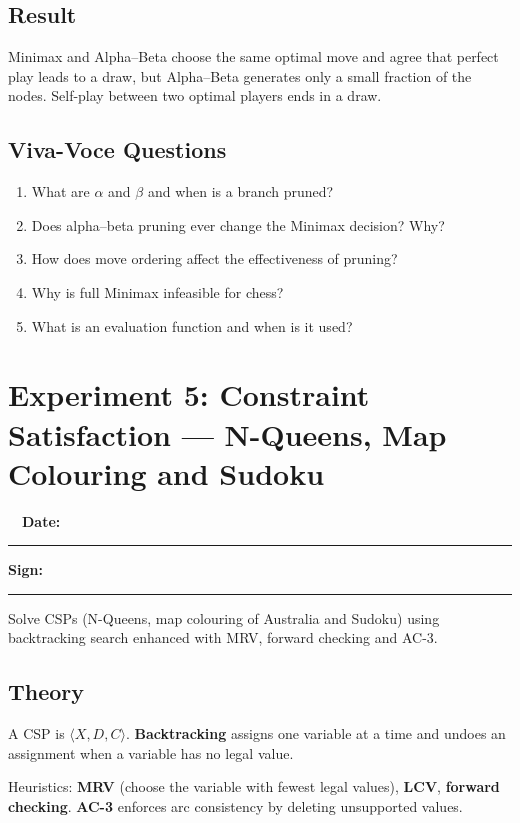 \documentclass[11pt]{article}
\begin{document}
\subsection*{Result}
\begin{outcome}Minimax and Alpha--Beta choose the same optimal move and agree that perfect play leads to a draw, but Alpha--Beta generates only a small fraction of the nodes. Self-play between two optimal players ends in a draw.\end{outcome}
\subsection*{Viva-Voce Questions}
\begin{enumerate}
\item What are $\alpha$ and $\beta$ and when is a branch pruned?
\item Does alpha--beta pruning ever change the Minimax decision? Why?
\item How does move ordering affect the effectiveness of pruning?
\item Why is full Minimax infeasible for chess?
\item What is an evaluation function and when is it used?
\end{enumerate}
\newpage
\section*{Experiment 5: Constraint Satisfaction --- N-Queens, Map Colouring and Sudoku}\label{exp5}
\noindent{}\ \ \hfill\textbf{\color{navy}Date:}\ \rule{3cm}{0.4pt}\quad\textbf{\color{navy}Sign:}\ \rule{3cm}{0.4pt}\par\medskip
\begin{keypoint}[Aim]Solve CSPs (N-Queens, map colouring of Australia and Sudoku) using backtracking search enhanced with MRV, forward checking and AC-3.\end{keypoint}
\subsection*{Theory}
A CSP is $\langle X,D,C\rangle$. \textbf{Backtracking} assigns one variable at a time and undoes an assignment when a variable has no legal value.

Heuristics: \textbf{MRV} (choose the variable with fewest legal values), \textbf{LCV}, \textbf{forward checking}. \textbf{AC-3} enforces arc consistency by deleting unsupported values.
\end{document}
